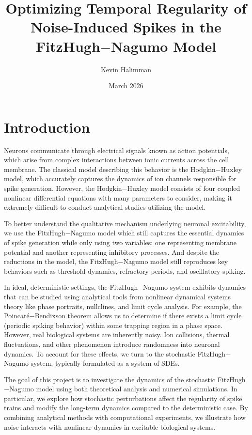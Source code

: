 \documentclass{article}
\title{Optimizing Temporal Regularity of Noise-Induced Spikes in the FitzHugh$-$Nagumo Model}
\author{Kevin Halimman}
\date{March 2026}
\begin{document}
\maketitle

\section{Introduction}
\doublespacing
Neurons communicate through electrical signals known as action potentials, which arise from complex interactions between ionic currents across the cell membrane. The classical model describing this behavior is the Hodgkin$-$Huxley model, which accurately captures the dynamics of ion channels responsible for spike generation. However, the Hodgkin$-$Huxley model consists of four coupled nonlinear differential equations with many parameters to consider, making it extremely difficult to conduct analytical studies utilizing the model.

To better understand the qualitative mechanism underlying neuronal excitability, we use the FitzHugh$-$Nagumo model which still captures the essential dynamics of spike generation while only using two variables: one representing membrane potential and another representing inhibitory processes. And despite the reductions in the model, the FitzHugh$-$Nagumo model still reproduces key behaviors such as threshold dynamics, refractory periods, and oscillatory spiking.

In ideal, deterministic settings, the FitzHugh$-$Nagumo system exhibits dynamics that can be studied using analytical tools from nonlinear dynamical systems theory like phase portraits, nullclines, and limit cycle analysis. For example, the Poincaré$-$Bendixson theorem allows us to determine if there exists a limit cycle (periodic spiking behavior) within some trapping region in a phase space. However, real biological systems are inherently noisy. Ion collisions, thermal fluctuations, and other phenomenon introduce randomness into neuronal dynamics. To account for these effects, we turn to the stochastic FitzHugh$-$Nagumo system, typically formulated as a system of SDEs. 

The goal of this project is to investigate the dynamics of the stochastic FitzHugh$-$Nagumo model using both theoretical analysis and numerical simulations. In particular, we explore how stochastic perturbations affect the regularity of spike trains and modify the long-term dynamics compared to the deterministic case. By combining analytical methods with computational experiments, we illustrate how noise interacts with nonlinear dynamics in excitable biological systems.
\end{document}
